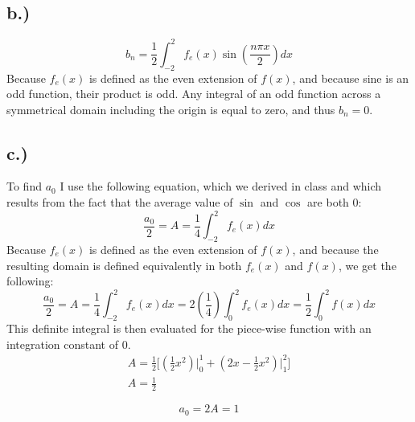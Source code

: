 \documentclass{article}
\begin{document}
\subsection*{b.)}
\begin{equation}
b_n = \frac{1}{2} \int_{-2}^2 f_e(x)\sin(\frac{n\pi x}{2})dx
\end{equation}
Because $f_e(x)$ is defined as the even extension of $f(x)$, and because sine is an odd function, their product is odd. Any integral of an odd function across a symmetrical domain including the origin is equal to zero, and thus $b_n = 0$.
\subsection*{c.)}
To find $a_0$ I use the following equation, which we derived in class and which results from the fact that the average value of $\sin$ and $\cos$ are both $0$:
\begin{equation}
\frac{a_0}{2} = A = \frac{1}{4}\int_{-2}^2 f_e(x)dx
\end{equation}
Because $f_e(x)$ is defined as the even extension of $f(x)$, and because the resulting domain is defined equivalently in both $f_e(x)$ and $f(x)$, we get the following:
\begin{equation}
\frac{a_0}{2} = A = \frac{1}{4}\int_{-2}^2 f_e(x)dx = 2(\frac{1}{4})\int_0^2 f_e(x)dx = \frac{1}{2}\int_0^2f(x)dx
\end{equation}
This definite integral is then evaluated for the piece-wise function with an integration constant of 0.
\begin{equation}
\begin{aligned}
A = \frac{1}{2}\Big[(\frac{1}{2}x^2) \Big|_0^1 + (2x-\frac{1}{2}x^2)\Big|_1^2\Big]\\
A = \frac{1}{2}
\end{aligned}
\end{equation}
\begin{tcolorbox}[minipage,colback=white,arc=0pt,outer arc=0pt]
\begin{equation}
a_0 = 2A = 1
\end{equation}
\end{tcolorbox}
\end{document}

